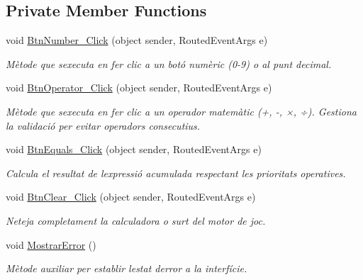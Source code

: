 \subsection*{Private Member Functions}
\begin{DoxyCompactItemize}
\item 
void \mbox{\hyperlink{class_p_a_c4___calculadora_1_1_main_window_ab4d09576c518172d01427afd0e967127}{Btn\+Number\+\_\+\+Click}} (object sender, Routed\+Event\+Args e)
\begin{DoxyCompactList}\small\item\em Mètode que s\textquotesingle{}executa en fer clic a un botó numèric (0-\/9) o al punt decimal. \end{DoxyCompactList}\item 
void \mbox{\hyperlink{class_p_a_c4___calculadora_1_1_main_window_a42ad8a5d111a5dc3e848a3a4be51bf36}{Btn\+Operator\+\_\+\+Click}} (object sender, Routed\+Event\+Args e)
\begin{DoxyCompactList}\small\item\em Mètode que s\textquotesingle{}executa en fer clic a un operador matemàtic (+, -\/, ×, ÷). Gestiona la validació per evitar operadors consecutius. \end{DoxyCompactList}\item 
void \mbox{\hyperlink{class_p_a_c4___calculadora_1_1_main_window_aa608d9b7d35fe6f657adb4f7af99ba22}{Btn\+Equals\+\_\+\+Click}} (object sender, Routed\+Event\+Args e)
\begin{DoxyCompactList}\small\item\em Calcula el resultat de l\textquotesingle{}expressió acumulada respectant les prioritats operatives. \end{DoxyCompactList}\item 
void \mbox{\hyperlink{class_p_a_c4___calculadora_1_1_main_window_a81c0d28ed62031f812ddf46780d2cda1}{Btn\+Clear\+\_\+\+Click}} (object sender, Routed\+Event\+Args e)
\begin{DoxyCompactList}\small\item\em Neteja completament la calculadora o surt del motor de joc. \end{DoxyCompactList}\item 
void \mbox{\hyperlink{class_p_a_c4___calculadora_1_1_main_window_a0c53c4846653c6a7f127f4582d0cf449}{Mostrar\+Error}} ()
\begin{DoxyCompactList}\small\item\em Mètode auxiliar per establir l\textquotesingle{}estat d\textquotesingle{}error a la interfície. \end{DoxyCompactList}\item 

\end{DoxyCompactItemize}
